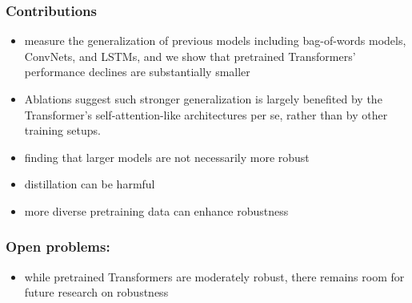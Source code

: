 \documentclass{article}
\begin{document}
\begin{flushleft}
\subsubsection*{Contributions}
\begin{itemize}
 \item measure the generalization of previous models including bag-of-words models, ConvNets, and LSTMs, and we show
that pretrained Transformers’ performance declines are substantially smaller 
\item Ablations suggest such stronger generalization is largely benefited by the Transformer’s self-attention-like architectures per se, rather than by other training setups.
 \item finding that larger models are not necessarily more robust
 \item distillation can be harmful
 \item more diverse pretraining data can enhance robustness
\end{itemize}

\subsubsection*{Open problems:}
\begin{itemize}
  \item while pretrained Transformers are moderately robust, there remains room for future research on robustness
\end{itemize}








\nocite{*}



\end{flushleft}
 
\end{document}

